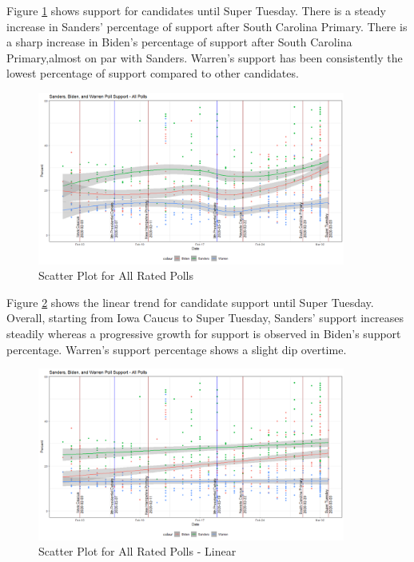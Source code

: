 Figure \ref{scatter-all} shows support for candidates until Super Tuesday. There is a steady increase in Sanders' percentage of support after South Carolina Primary. There is a sharp increase in Biden's percentage of support after South Carolina Primary,almost on par with Sanders. Warren's support has been consistently the lowest percentage of support compared to other candidates. 
\begin{figure}[H]
    \centering
    \includegraphics[width=0.9\textwidth]{figures/scatter-all.png}
    \caption{Scatter Plot for All Rated Polls}
    \label{scatter-all}
\end{figure}
Figure \ref{scatter-all-linear} shows the linear trend for candidate support until Super Tuesday. Overall, starting from Iowa Caucus to Super Tuesday, Sanders' support increases steadily whereas a progressive growth for support is observed in Biden's support percentage. Warren's support percentage shows a slight dip overtime.
\begin{figure}[H]
    \centering
    \includegraphics[width=0.9\textwidth]{figures/scatter-all-linear.png}
    \caption{Scatter Plot for All Rated Polls - Linear}
    \label{scatter-all-linear}
\end{figure}

